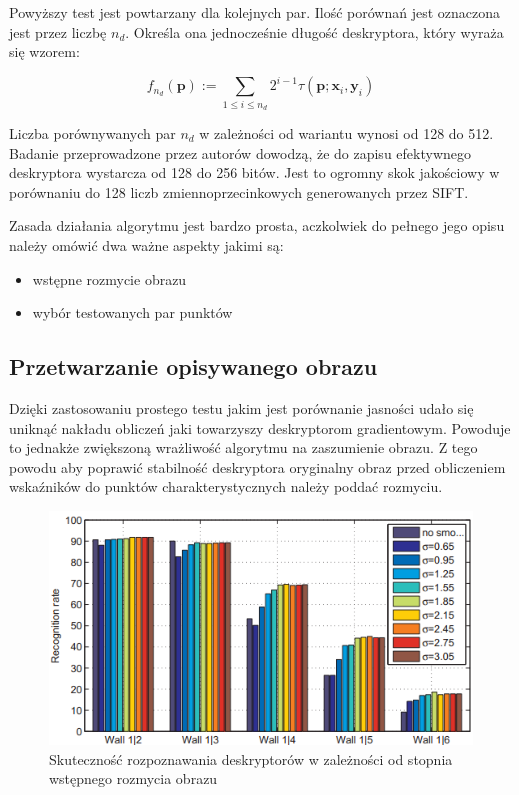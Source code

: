 Powyższy test jest powtarzany dla kolejnych par. Ilość porównań jest oznaczona jest przez liczbę $n_d$. Określa ona jednocześnie długość deskryptora, który wyraża się wzorem:



\begin{equation}
f_{n_d}(\textbf{p}):= \sum\limits_{1 \leq i \leq n_d} 2^{i-1} \tau(\textbf{p};\textbf{x}_i,\textbf{y}_i)
\end{equation}

Liczba porównywanych par $n_d$ w zależności od wariantu wynosi od 128 do 512. Badanie przeprowadzone przez autorów dowodzą, że do zapisu efektywnego deskryptora wystarcza od 128 do 256 bitów. Jest to ogromny skok jakościowy w porównaniu do 128 liczb zmiennoprzecinkowych generowanych przez SIFT.

Zasada działania algorytmu jest bardzo prosta, aczkolwiek do pełnego jego opisu należy omówić dwa ważne aspekty jakimi są:
\begin{itemize}
\item wstępne rozmycie obrazu
\item wybór testowanych par punktów
\end{itemize}


\subsection{Przetwarzanie opisywanego obrazu}
Dzięki zastosowaniu prostego testu jakim jest porównanie jasności udało się uniknąć nakładu obliczeń jaki towarzyszy deskryptorom gradientowym. Powoduje to jednakże zwiększoną wrażliwość algorytmu na zaszumienie obrazu. Z tego powodu aby poprawić stabilność deskryptora oryginalny obraz przed obliczeniem wskaźników do punktów charakterystycznych należy poddać rozmyciu. 

\begin{figure}
\centering
\includegraphics[scale=0.8]{pict/02/brief/sigma_comp.png}
\caption{Skuteczność rozpoznawania deskryptorów w zależności od stopnia wstępnego rozmycia obrazu}
\label{fig:brief_sigma_comp}
\end{figure}


